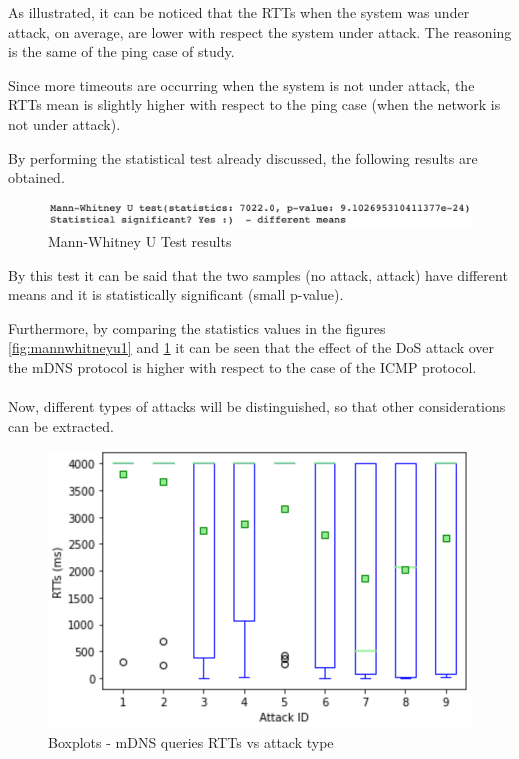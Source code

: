 \documentclass[fleqn, 11pt]{SelfArx} %
\begin{document}
As illustrated, it can be noticed that the RTTs when the system was under attack, on average, are lower with respect the system under attack.
The reasoning is the same of the ping case of study.

Since more timeouts are occurring when the system is not under attack, the RTTs mean is slightly higher with respect to the ping case (when the network is not under attack).

By performing the statistical test already discussed, the following results are obtained.
\begin{figure}[H]\centering
    \includegraphics[width=\linewidth]{./mdns/mannwhitneyu2.png}
    \caption{Mann-Whitney U Test results}
	\label{fig:mannwhitneyu2}
\end{figure}
By this test it can be said that the two samples (no attack, attack) have different means and it is statistically significant (small p-value).

Furthermore, by comparing the statistics values in the figures \ref{fig:mannwhitneyu1} and \ref{fig:mannwhitneyu2} it can be seen that the effect of the DoS attack over the mDNS protocol is higher with respect to the case of the ICMP protocol. 
\\\\
Now, different types of attacks will be distinguished, so that other considerations can be extracted.

\begin{figure}[H]\centering
    \includegraphics[width=\linewidth]{./mdns/mdns-boxplot2.png}
    \caption{Boxplots - mDNS queries RTTs vs attack type}
	\label{fig:mdnsbp2}
\end{figure}
\end{document}
